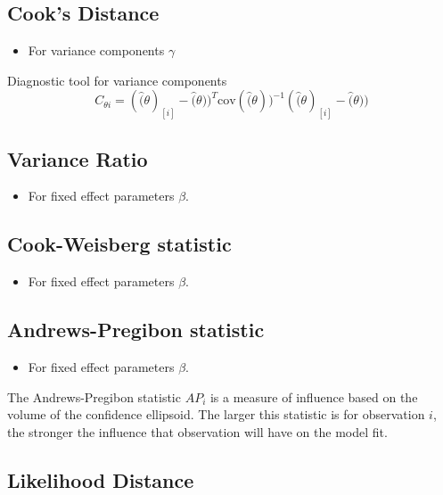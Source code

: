 \documentclass[12pt, a4paper]{article}
\theoremstyle{plain}
\theoremstyle{definition}
\theoremstyle{remark}
\begin{document}
\subsection{Cook's Distance} %
\begin{itemize}
\item For variance components $\gamma$
\end{itemize}

Diagnostic tool for variance components
\[ C_{\theta i} =(\hat(\theta)_{[i]} - \hat(\theta))^{T}\mbox{cov}( \hat(\theta))^{-1}(\hat(\theta)_{[i]} - \hat(\theta))\]

\subsection{Variance Ratio} %
\begin{itemize}
\item For fixed effect parameters $\beta$.
\end{itemize}

\subsection{Cook-Weisberg statistic} %
\begin{itemize}
\item For fixed effect parameters $\beta$.
\end{itemize}

\subsection{Andrews-Pregibon statistic} %
\begin{itemize}
\item For fixed effect parameters $\beta$.
\end{itemize}
The Andrews-Pregibon statistic $AP_{i}$ is a measure of influence based on the volume of the confidence ellipsoid.
The larger this statistic is for observation $i$, the stronger the influence that observation will have on the model fit.






\subsection{Likelihood Distance}
\end{document}
